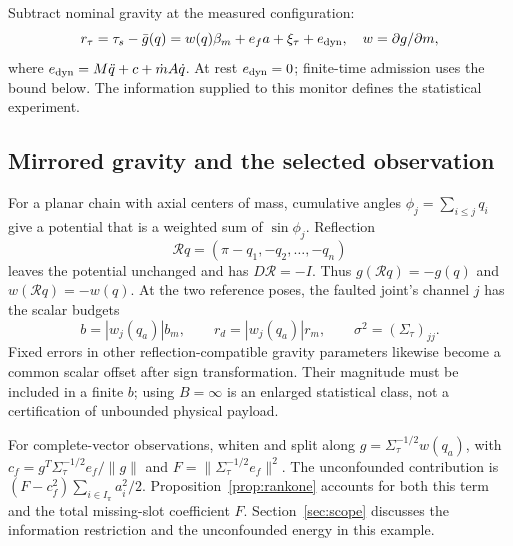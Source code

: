 Subtract nominal gravity at the measured configuration:
\begin{equation}
 r_\tau=\tau_s-\bar g(q)
       =w(q)\beta_m+e_fa+\xi_\tau+e_{\rm dyn},\quad
 w=\partial g/\partial m,\label{eq:static}
\end{equation}
where $e_{\rm dyn}=M\ddot q+c+\dot m A\dot q$. At rest $e_{\rm dyn}=0$; finite-time admission uses the bound below. The information supplied to this monitor defines the statistical experiment.

\subsection{Mirrored gravity and the selected observation}
For a planar chain with axial centers of mass, cumulative angles $\phi_j=\sum_{i\le j}q_i$ give a potential that is a weighted sum of $\sin\phi_j$. Reflection
\begin{equation}
 \mathcal Rq=(\pi-q_1,-q_2,\ldots,-q_n)
\end{equation}
leaves the potential unchanged and has $D\mathcal R=-I$. Thus $g(\mathcal Rq)=-g(q)$ and $w(\mathcal Rq)=-w(q)$. At the two reference poses, the faulted joint's channel $j$ has the scalar budgets
\begin{equation}
 b=|w_j(q_a)|b_m,\qquad r_d=|w_j(q_a)|r_m,
 \qquad\sigma^2=(\Sigma_\tau)_{jj}.
\end{equation}
Fixed errors in other reflection-compatible gravity parameters likewise become a common scalar offset after sign transformation. Their magnitude must be included in a finite $b$; using $B=\infty$ is an enlarged statistical class, not a certification of unbounded physical payload.

For complete-vector observations, whiten and split along $g=\Sigma_\tau^{-1/2}w(q_a)$, with $c_f=g^T\Sigma_\tau^{-1/2}e_f/\|g\|$ and $F=\|\Sigma_\tau^{-1/2}e_f\|^2$. The unconfounded contribution is $(F-c_f^2)\sum_{i\in I_\pi}a_i^2/2$. Proposition~\ref{prop:rankone} accounts for both this term and the total missing-slot coefficient $F$. Section~\ref{sec:scope} discusses the information restriction and the unconfounded energy in this example.

